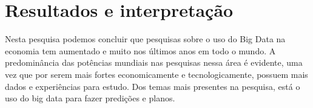 \section{Resultados e interpretação}
Nesta pesquisa podemos concluir que pesquisas sobre o uso do Big Data na economia tem aumentado e muito nos últimos anos em todo o mundo. A predominância das potências mundiais nas pesquisas nessa área é evidente, uma vez que por serem mais fortes economicamente e tecnologicamente, possuem mais dados e experiências para estudo. Dos temas mais presentes na pesquisa, está o uso do big data para fazer predições e planos.